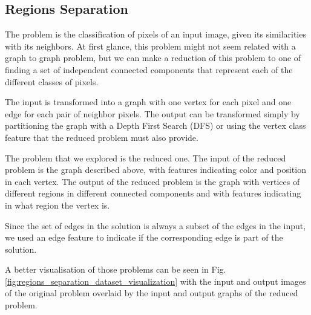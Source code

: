 \subsection{Regions Separation}

The problem is the classification of pixels of an input image, given its similarities with its neighbors. At first glance, this problem might not seem related with a graph to graph problem, but we can make a reduction of this problem to one of finding a set of independent connected components that represent each of the different classes of pixels. 

The input is transformed into a graph with one vertex for each pixel and one edge for each pair of neighbor pixels. The output can be transformed simply by partitioning the graph with a Depth First Search (DFS) or using the vertex class feature that the reduced problem must also provide.

The problem that we explored is the reduced one. The input of the reduced problem is the graph described above, with features indicating color and position in each vertex. The output of the reduced problem is the graph with vertices of different regions in different connected components and with features indicating in what region the vertex is. 

Since the set of edges in the solution is always a subset of the edges in the input, we used an edge feature to indicate if the corresponding edge is part of the solution.

A better visualisation of those problems can be seen in Fig. \ref{fig:regions_separation_dataset_visualization} with the input and output images of the original problem overlaid by the input and output graphs of the reduced problem.


